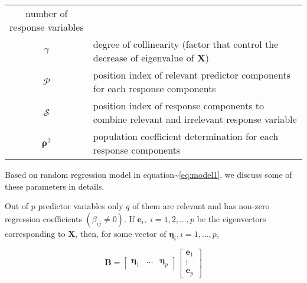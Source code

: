 \documentclass[12pt,A4paper,authoryear]{elsarticle} %
\begin{document}
\begin{longtable}[]{@{}cl@{}}
\begin{minipage}[t]{0.75\columnwidth}
number of response variables\strut
\end{minipage}\tabularnewline
\begin{minipage}[t]{0.19\columnwidth}\centering\strut
\(\gamma\)\strut
\end{minipage} & \begin{minipage}[t]{0.75\columnwidth}\raggedright\strut
degree of collinearity (factor that control the decrease of eigenvalue
of \(\mathbf{X}\))\strut
\end{minipage}\tabularnewline
\begin{minipage}[t]{0.19\columnwidth}\centering\strut
\(\mathcal{P}\)\strut
\end{minipage} & \begin{minipage}[t]{0.75\columnwidth}\raggedright\strut
position index of relevant predictor components for each response
components\strut
\end{minipage}\tabularnewline
\begin{minipage}[t]{0.19\columnwidth}\centering\strut
\(\mathcal{S}\)\strut
\end{minipage} & \begin{minipage}[t]{0.75\columnwidth}\raggedright\strut
position index of response components to combine relevant and irrelevant
response variable\strut
\end{minipage}\tabularnewline
\begin{minipage}[t]{0.19\columnwidth}\centering\strut
\(\boldsymbol{\rho}^2\)\strut
\end{minipage} & \begin{minipage}[t]{0.75\columnwidth}\raggedright\strut
population coefficient determination for each response components\strut
\end{minipage}\tabularnewline
\bottomrule
\end{longtable}

Based on random regression model in
equation\textasciitilde{}\eqref{eq:model1}, we discuss some of these
parameters in details.

Out of \(p\) predictor variables only \(q\) of them are relevant and has
non-zero regression coefficients \((\beta_{ij} \ne 0)\). If
\(\boldsymbol{e}_i, \; i = 1, 2, \ldots, p\) be the eigenvectors
corresponding to \(\mathbf{X}\), then, for some vector of
\(\boldsymbol{\eta}_i, i = 1, \ldots, p\),

\begin{equation}
\mathbf{B} = \begin{bmatrix} \boldsymbol{\eta}_1 & \ldots & \boldsymbol{\eta}_p \end{bmatrix} \begin{bmatrix} \mathbf{e}_1 \\ \vdots \\ \mathbf{e}_p \end{bmatrix}
\label{eq:beta-eigenvector-relation}
\end{equation}
\end{document}
